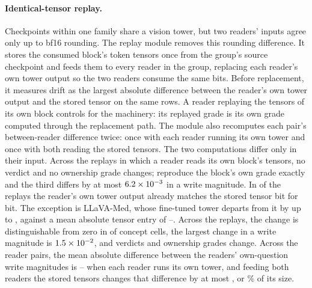 \paragraph{Identical-tensor replay.} Checkpoints within one family share a vision tower, but two readers' inputs agree only up to bf16 rounding. The replay module removes this rounding difference. It stores the consumed block's token tensors once from the group's source checkpoint and feeds them to every reader in the group, replacing each reader's own tower output so the two readers consume the same bits. Before replacement, it measures drift as the largest absolute difference between the reader's own tower output and the stored tensor on the same rows. A reader replaying the tensors of its own block controls for the machinery: its replayed grade is its own grade computed through the replacement path. The module also recomputes each pair's between-reader difference twice: once with each reader running its own tower and once with both reading the stored tensors. The two computations differ only in their input. Across the \cfReplaySelf{} replays in which a reader reads its own block's tensors, no verdict and no ownership grade changes; \cfReplaySelfExact{} reproduce the block's own grade exactly and the third differs by at most $6.2\times10^{-3}$ in a write magnitude. In \cfReplayDriftZero{} of the \cfReplayBlocks{} replays the reader's own tower output already matches the stored tensor bit for bit. The exception is LLaVA-Med, whose fine-tuned tower departs from it by up to \cfReplayDriftMax{}, against a mean absolute tensor entry of \cfReplayTensorMin{}--\cfReplayTensorMax{}. Across the \cfReplayBlocks{} replays, the change is distinguishable from zero in \cfReplayMoved{} of \cfReplayCells{} concept cells, the largest change in a write magnitude is $1.5\times10^{-2}$, and \cfReplayVerdictChanges{} verdicts and \cfReplayOwnedChanges{} ownership grades change. Across the \cfReplayPairs{} reader pairs, the mean absolute difference between the readers' own-question write magnitudes is \cfReplayPairOwnMin{}--\cfReplayPairOwnMax{} when each reader runs its own tower, and feeding both readers the stored tensors changes that difference by at most \cfReplayChangeMax{}, or \cfReplayRelMax\% of its size.

